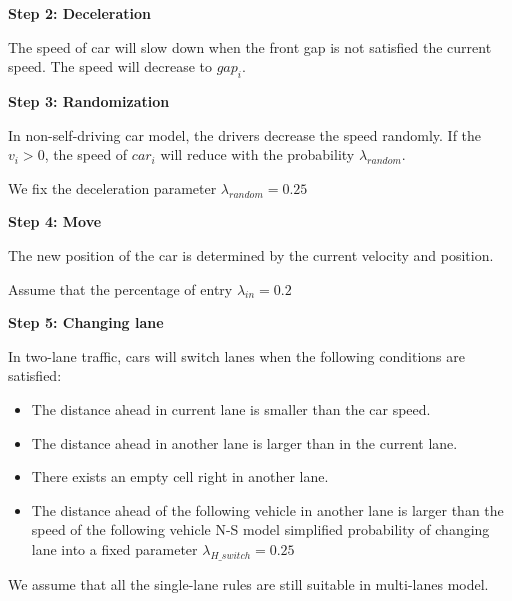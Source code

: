 \documentclass{mcmthesis}
\numberwithin{equation}{section}
\begin{document}
			\textbf{Step 2: Deceleration}

				The speed of car will slow down when the front gap is not satisfied the current speed. The speed will decrease to $gap_{i}$.

			\textbf{Step 3: Randomization}

				In non-self-driving car model, the drivers decrease the speed randomly. If the $v_{i}>0$, the speed of $car_{i}$ will reduce with the probability $\lambda_{random}$.

				We fix the deceleration parameter $\lambda_{random}=0.25$

			\textbf{Step 4: Move}

				The new position of the car is determined by the current velocity and position.

				Assume that the percentage of entry $\lambda_{in}=0.2$

			\textbf{Step 5: Changing lane}

				In two-lane traffic, cars will switch lanes when the following conditions are satisfied:
				\begin{itemize}
					\item The distance ahead in current lane is smaller than the car speed.
					\item The distance ahead in another lane is larger than in the current lane.
					\item There exists an empty cell right in another lane.
					\item The distance ahead of the following vehicle in another lane is larger than the speed of the following vehicle
						N-S model simplified probability of changing lane into a fixed parameter $\lambda_{H\_switch} = 0.25$
				\end{itemize} 

				We assume that all the single-lane rules are still suitable in multi-lanes model. 		
\end{document}
